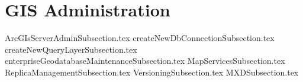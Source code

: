 
\section{GIS Administration}
{ArcGIsServerAdminSubsection.tex}
\clearpage
{createNewDbConnectionSubsection.tex}
\clearpage
{createNewQueryLayerSubsection.tex}
\clearpage
{enterpriseGeodatabaseMaintenanceSubsection.tex}
\clearpage
{MapServicesSubsection.tex}
\clearpage
{ReplicaManagementSubsection.tex}
\clearpage
{VersioningSubsection.tex}
\clearpage
{MXDSubsection.tex}


